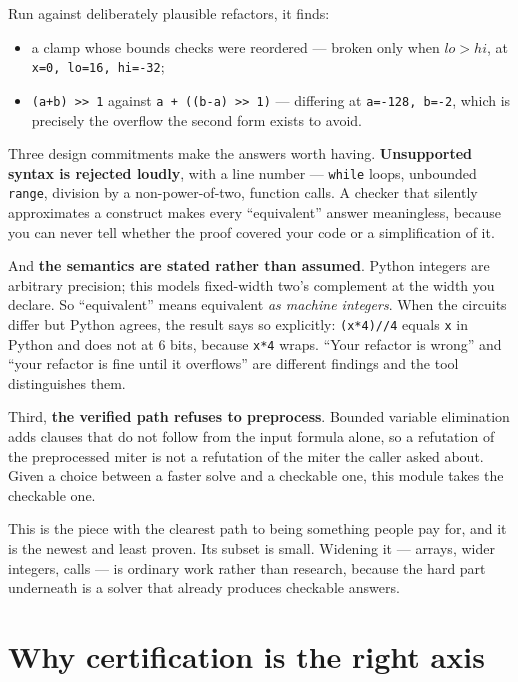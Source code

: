 \documentclass[11pt,a4paper]{article}
\begin{document}
Run against deliberately plausible refactors, it finds:

\begin{itemize}
  \item a clamp whose bounds checks were reordered --- broken only when
        $\mathit{lo} > \mathit{hi}$, at \texttt{x=0, lo=16, hi=-32};
  \item \texttt{(a+b) >> 1} against \texttt{a + ((b-a) >> 1)} --- differing at
        \texttt{a=-128, b=-2}, which is precisely the overflow the second form
        exists to avoid.
\end{itemize}

Three design commitments make the answers worth having. \textbf{Unsupported
syntax is rejected loudly}, with a line number --- \texttt{while} loops,
unbounded \texttt{range}, division by a non-power-of-two, function calls. A
checker that silently approximates a construct makes every ``equivalent''
answer meaningless, because you can never tell whether the proof covered your
code or a simplification of it.

And \textbf{the semantics are stated rather than assumed}. Python integers are
arbitrary precision; this models fixed-width two's complement at the width you
declare. So ``equivalent'' means equivalent \emph{as machine integers}. When
the circuits differ but Python agrees, the result says so explicitly:
\texttt{(x*4)//4} equals \texttt{x} in Python and does not at 6 bits, because
\texttt{x*4} wraps. ``Your refactor is wrong'' and ``your refactor is fine
until it overflows'' are different findings and the tool distinguishes them.

Third, \textbf{the verified path refuses to preprocess}. Bounded variable
elimination adds clauses that do not follow from the input formula alone, so a
refutation of the preprocessed miter is not a refutation of the miter the
caller asked about. Given a choice between a faster solve and a checkable one,
this module takes the checkable one.

This is the piece with the clearest path to being something people pay for, and
it is the newest and least proven. Its subset is small. Widening it --- arrays,
wider integers, calls --- is ordinary work rather than research, because the
hard part underneath is a solver that already produces checkable answers.

\section{Why certification is the right axis}
\end{document}
